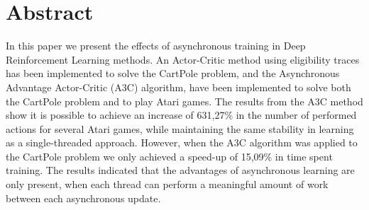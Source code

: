 \documentclass[11pt]{article}
\begin{document}
\section*{Abstract}

In this paper we present the effects of asynchronous training in
Deep Reinforcement Learning methods.
An Actor-Critic method using eligibility traces has been implemented to solve the CartPole problem,
and the Asynchronous Advantage
Actor-Critic (A3C) algorithm,
have been implemented to solve both the CartPole problem and to play Atari games.
The results from the A3C method show it is possible to achieve an increase of 631,27\% in
the number of performed actions for several Atari games,
while maintaining the same stability in learning as a single-threaded approach.
However, when the A3C algorithm was applied to the CartPole problem
we only achieved a speed-up of 15,09\% in time spent training.
The results indicated that the advantages of asynchronous learning are only present,
when each thread can perform a meaningful amount of work between
each asynchronous update.
\end{document}
